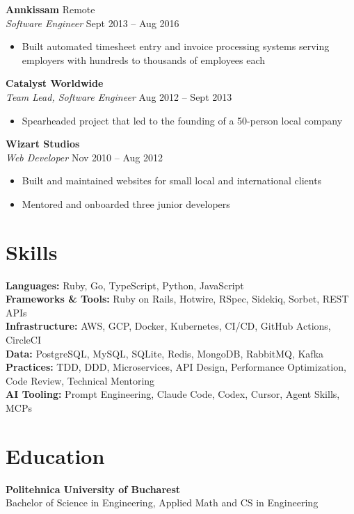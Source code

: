 \documentclass[a4paper, 11pt]{article}
\newcommand{\role}[4]{%
  \vspace{0.5em}
  \needspace{4\baselineskip}%
  \textbf{#1} \hfill \textcolor{light}{#3}\\
  \textit{#2} \hfill \textcolor{light}{#4}\\[0.2em]
}
\begin{document}
\role{Annkissam}{Software Engineer}{Remote}{Sept 2013 -- Aug 2016}
\begin{itemize}
  \item Built automated timesheet entry and invoice processing systems serving employers with hundreds to thousands of employees each
\end{itemize}

\role{Catalyst Worldwide}{Team Lead, Software Engineer}{}{Aug 2012 -- Sept 2013}
\begin{itemize}
  \item Spearheaded project that led to the founding of a 50-person local company
\end{itemize}

\role{Wizart Studios}{Web Developer}{}{Nov 2010 -- Aug 2012}
\begin{itemize}
  \item Built and maintained websites for small local and international clients
  \item Mentored and onboarded three junior developers
\end{itemize}

\section*{Skills}

\textbf{Languages:} Ruby, Go, TypeScript, Python, JavaScript\\[0.3em]
\textbf{Frameworks \& Tools:} Ruby on Rails, Hotwire, RSpec, Sidekiq, Sorbet, REST APIs\\[0.3em]
\textbf{Infrastructure:} AWS, GCP, Docker, Kubernetes, CI/CD, GitHub Actions, CircleCI\\[0.3em]
\textbf{Data:} PostgreSQL, MySQL, SQLite, Redis, MongoDB, RabbitMQ, Kafka\\[0.3em]
\textbf{Practices:} TDD, DDD, Microservices, API Design, Performance Optimization, Code Review, Technical Mentoring\\[0.3em]
\textbf{AI Tooling:} Prompt Engineering, Claude Code, Codex, Cursor, Agent Skills, MCPs\\[0.3em]

\section*{Education}

\textbf{Politehnica University of Bucharest}\\
Bachelor of Science in Engineering, Applied Math and CS in Engineering
\end{document}
